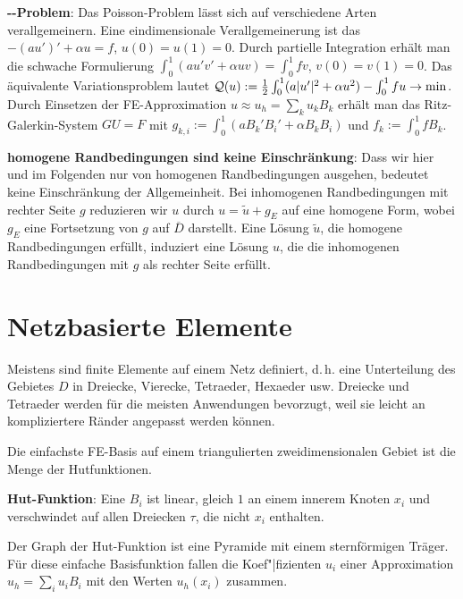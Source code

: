 \linie

\textbf{--Problem}:
Das Poisson-Problem lässt sich auf verschiedene Arten verallgemeinern.
Eine eindimensionale Verallgemeinerung ist das \\
$-(au')' + \alpha u = f$, $u(0) = u(1) = 0$.
Durch partielle Integration erhält man die schwache Formulierung
$\int_0^1 (au'v' + \alpha uv) = \int_0^1 fv$, $v(0) = v(1) = 0$.
Das äquivalente Variationsproblem lautet
$\mathcal{Q}(u) := \frac{1}{2} \int_0^1 (a|u'|^2 + \alpha u^2) - \int_0^1 fu \rightarrow \min$.\\
Durch Einsetzen der FE-Approximation $u \approx u_h = \sum_k u_k B_k$ erhält man das
Ritz-Galerkin-System $GU = F$ mit
$g_{k,i} := \int_0^1 (a B_k' B_i' + \alpha B_k B_i)$ und $f_k := \int_0^1 f B_k$.

\linie

\textbf{homogene Randbedingungen sind keine Einschränkung}:
Dass wir hier und im Folgenden nur von homogenen Randbedingungen ausgehen, bedeutet keine
Einschränkung der Allgemeinheit.
Bei inhomogenen Randbedingungen mit rechter Seite $g$ reduzieren wir $u$ durch
$u = \widetilde{u} + g_E$ auf eine homogene Form, wobei $g_E$ eine Fortsetzung von $g$ auf
$\overline{D}$ darstellt.
Eine Lösung $\widetilde{u}$, die homogene Randbedingungen erfüllt, induziert eine Lösung
$u$, die die inhomogenen Randbedingungen mit $g$ als rechter Seite erfüllt.

\section{%
    Netzbasierte Elemente%
}

Meistens sind finite Elemente auf einem Netz definiert, d.\,h. eine Unterteilung des Gebietes $D$
in Dreiecke, Vierecke, Tetraeder, Hexaeder usw.
Dreiecke und Tetraeder werden für die meisten Anwendungen bevorzugt, weil sie leicht an
kompliziertere Ränder angepasst werden können.

Die einfachste FE-Basis auf einem triangulierten zweidimensionalen Gebiet ist die Menge der
Hutfunktionen.

\textbf{Hut-Funktion}:
Eine  $B_i$ ist linear, gleich $1$ an einem innerem Knoten $x_i$ und
verschwindet auf allen Dreiecken $\tau$, die nicht $x_i$ enthalten.

Der Graph der Hut-Funktion ist eine Pyramide mit einem sternförmigen Träger.
Für diese einfache Basisfunktion fallen die Koef"|fizienten $u_i$ einer Approximation
$u_h = \sum_i u_i B_i$ mit den Werten $u_h(x_i)$ zusammen.

